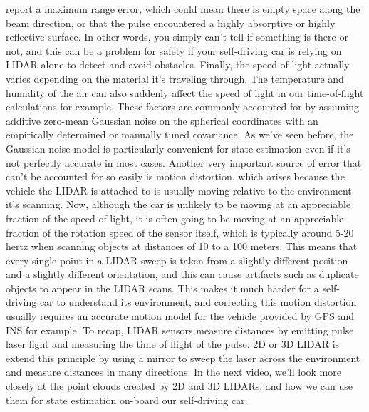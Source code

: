 report a maximum range error, which could mean there is empty space
along the beam direction, or that the pulse encountered a highly absorptive or
highly reflective surface. In other words, you simply can't
tell if something is there or not, and this can be a problem for
safety if your self-driving car is relying on LIDAR alone to
detect and avoid obstacles. Finally, the speed of light actually varies depending on the material
it's traveling through. The temperature and humidity
of the air can also suddenly affect the speed of light in our
time-of-flight calculations for example. These factors are
commonly accounted for by assuming additive zero-mean
Gaussian noise on the spherical coordinates with an empirically determined or
manually tuned covariance. As we've seen before, the Gaussian noise model is
particularly convenient for state estimation even if it's not
perfectly accurate in most cases. Another very important source
of error that can't be accounted for so easily
is motion distortion, which arises because the vehicle
the LIDAR is attached to is usually moving relative to
the environment it's scanning. Now, although the car is unlikely to be moving at an appreciable fraction
of the speed of light, it is often going to be moving at an appreciable fraction of
the rotation speed of the sensor itself, which is typically around 5-20 hertz when scanning objects at distances
of 10 to a 100 meters. This means that every single point
in a LIDAR sweep is taken from a slightly different position and
a slightly different orientation, and this can cause artifacts such as duplicate objects to
appear in the LIDAR scans. This makes it much harder for a self-driving car to
understand its environment, and correcting this motion
distortion usually requires an accurate motion model for the vehicle provided by GPS and INS for example. To recap, LIDAR sensors
measure distances by emitting pulse laser light and measuring
the time of flight of the pulse. 2D or 3D LIDAR is extend
this principle by using a mirror to sweep the laser across the environment and measure distances in many directions. In the next video, we'll look more closely at the point
clouds created by 2D and 3D LIDARs, and how we can use them for state
estimation on-board our self-driving car.
